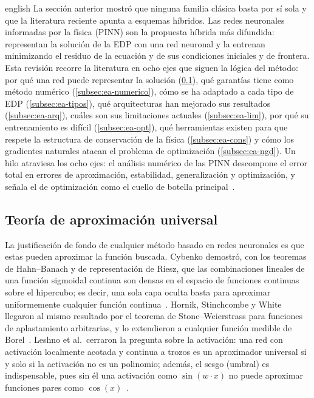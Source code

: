 \documentclass[../0000.tex]{subfiles}
\begin{document}
\begin{hyphenrules}{english}
La sección anterior mostró que ninguna familia clásica basta por sí sola y que la literatura reciente apunta a esquemas híbridos. Las redes neuronales informadas por la física (PINN) son la propuesta híbrida más difundida: representan la solución de la EDP con una red neuronal y la entrenan minimizando el residuo de la ecuación y de sus condiciones iniciales y de frontera. Esta revisión recorre la literatura en ocho ejes que siguen la lógica del método: por qué una red puede representar la solución (\ref{subsec:ea-aprox}), qué garantías tiene como método numérico (\ref{subsec:ea-numerico}), cómo se ha adaptado a cada tipo de EDP (\ref{subsec:ea-tipos}), qué arquitecturas han mejorado sus resultados (\ref{subsec:ea-arq}), cuáles son sus limitaciones actuales (\ref{subsec:ea-lim}), por qué su entrenamiento es difícil (\ref{subsec:ea-opt}), qué herramientas existen para que respete la estructura de conservación de la física (\ref{subsec:ea-cons}) y cómo los gradientes naturales atacan el problema de optimización (\ref{subsec:ea-ngd}). Un hilo atraviesa los ocho ejes: el análisis numérico de las PINN descompone el error total en errores de aproximación, estabilidad, generalización y optimización, y señala el de optimización como el cuello de botella principal~\cite{de2024numerical}.

\subsection{Teoría de aproximación universal}
\label{subsec:ea-aprox}

La justificación de fondo de cualquier método basado en redes neuronales es que estas pueden aproximar la función buscada. Cybenko demostró, con los teoremas de Hahn--Banach y de representación de Riesz, que las combinaciones lineales de una función sigmoidal continua son densas en el espacio de funciones continuas sobre el hipercubo; es decir, una sola capa oculta basta para aproximar uniformemente cualquier función continua~\cite{cybenko1989approximation}. Hornik, Stinchcombe y White llegaron al mismo resultado por el teorema de Stone--Weierstrass para funciones de aplastamiento arbitrarias, y lo extendieron a cualquier función medible de Borel~\cite{hornik1989multilayer}. Leshno et al.\ cerraron la pregunta sobre la activación: una red con activación localmente acotada y continua a trozos es un aproximador universal si y solo si la activación no es un polinomio; además, el sesgo (umbral) es indispensable, pues sin él una activación como $\sin(w\cdot x)$ no puede aproximar funciones pares como $\cos(x)$~\cite{leshno1993multilayer}.


\end{hyphenrules}
\end{document}
